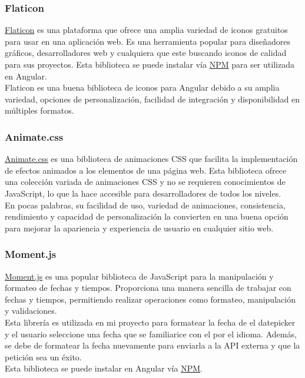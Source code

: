\subsubsection{Flaticon}
\href{https://www.flaticon.com/}{Flaticon} es una plataforma que ofrece una amplia variedad de iconos gratuitos para usar en una aplicación web. Es una herramienta popular para diseñadores gráficos, desarrolladores web y cualquiera que este buscando iconos de calidad para sus proyectos.
Esta biblioteca se puede instalar vía \href{https://www.npmjs.com/package/@flaticon/flaticon-uicons?activeTab=readme}{NPM} para ser utilizada en Angular. \\
Flaticon es una buena biblioteca de iconos para Angular debido a su amplia variedad, opciones de personalización, facilidad de integración y disponibilidad en múltiples formatos.
\subsubsection{Animate.css}
\href{https://animate.style/}{Animate.css} es una biblioteca de animaciones CSS que facilita la implementación de efectos animados a los elementos de una página web. Esta biblioteca ofrece una colección variada de animaciones CSS y no se requieren conocimientos de JavaScript, lo que la hace accesible para desarrolladores de todos los niveles. \\
En pocas palabras, su facilidad de uso, variedad de animaciones, consistencia, rendimiento y capacidad de personalización la convierten en una buena opción para mejorar la apariencia y experiencia de usuario en cualquier sitio web.
\subsubsection{Moment.js}
\href{https://momentjs.com/}{Moment.js} es una popular biblioteca de JavaScript para la manipulación y formateo de fechas y tiempos. Proporciona una manera sencilla de trabajar con fechas y tiempos, permitiendo realizar operaciones como formateo, manipulación y validaciones. \\
Esta librería es utilizada en mi proyecto para formatear la fecha de el datepicker y el usuario seleccione una fecha que se familiarice con el por el idioma. Además, se debe de formatear la fecha nuevamente para enviarla a la API externa y que la petición sea un éxito. \\
Esta biblioteca se puede instalar en Angular vía \href{https://www.npmjs.com/package/moment}{NPM}.

